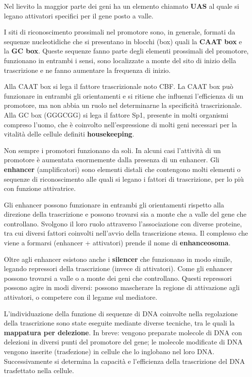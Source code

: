 \documentclass[]{article}
\begin{document}
Nel lievito la maggior parte dei geni ha un elemento chiamato
\textbf{UAS} al quale si legano attivatori specifici per il gene posto a
valle.

I siti di riconoscimento prossimali nel promotore sono, in generale,
formati da sequenze nucleotidiche che si presentano in blocchi (box)
quali la \textbf{CAAT box} e la \textbf{GC box}. Queste sequenze fanno
parte degli elementi prossimali del promotore, funzionano in entrambi i
sensi, sono localizzate a monte del sito di inizio della trascrizione e
ne fanno aumentare la frequenza di inizio.

Alla CAAT box si lega il fattore trascrizionale noto CBF. La CAAT box
può funzionare in entrambi gli orientamenti e si ritiene che influenzi
l'efficienza di un promotore, ma non abbia un ruolo nel determinarne la
specificità trascrizionale. Alla GC box (GGGCGG) si lega il fattore Sp1,
presente in molti organismi compreso l'uomo, che è coinvolto
nell'espressione di molti geni necessari per la vitalità delle cellule
definiti \textbf{housekeeping}.

Non sempre i promotori funzionano da soli. In alcuni casi l'attività di
un promotore è aumentata enormemente dalla presenza di un enhancer. Gli
\textbf{enhancer} (amplificatori) sono elementi distali che contengono
molti elementi o sequenze di riconoscimento alle quali si legano i
fattori di trascrizione, per lo più con funzione attivatrice.

Gli enhancer possono funzionare in entrambi gli orientamenti rispetto
alla direzione della trascrizione e possono trovarsi sia a monte che a
valle del gene che controllano. Svolgono il loro ruolo attraverso
l'associazione con diverse proteine, tra cui diversi fattori coinvolti
nell'avvio della trascrizione stessa. Il complesso che viene a formarsi
(enhancer + attivatori) prende il nome di \textbf{enhanceosoma}.

Oltre agli enhancer esistono anche i \textbf{silencer} che funzionano in
modo simile, legando repressori della trascrizione (invece di
attivatori). Come gli enhancer possono trovarsi a valle o a monte dei
geni che controllano. Questi repressori possono agire in modi diversi:
possono mascherare la regione di attivazione agli attivatori, o
competere con il legame sul mediatore.

L'individuazione della funzione di sequenze di DNA coinvolte nella
regolazione della trascrizione sono state eseguite mediante diverse
tecniche, tra le quali la \textbf{mappatura per delezione}. In breve:
vengono preparate molecole di DNA con delezioni in diversi punti del
promotore del gene; le molecole modificate di DNA vengono inserite
(trasfezione) in cellule che lo inglobano nel loro DNA. Successivamente
si determina la capacità e l'efficienza della trascrizione del DNA
trasfettato nella cellule.
\end{document}
